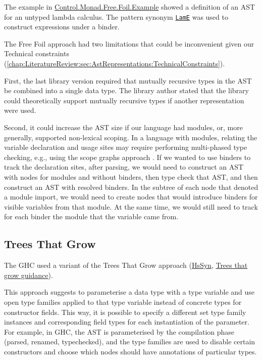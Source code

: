 The example in \href{https://hackage.haskell.org/package/free-foil-0.2.0/docs/Control-Monad-Free-Foil-Example.html}{Control.Monad.Free.Foil.Example} showed a definition of an AST for an untyped lambda calculus. The pattern synonym \href{https://hackage.haskell.org/package/free-foil-0.2.0/docs/src/Control.Monad.Free.Foil.Example.html#LamE}{\texttt{LamE}} was used to construct expressions under a binder.

The Free Foil approach had two limitations that could be inconvenient given our Technical constraints (\cref{chap:LiteratureReview:sec:AstRepresentations:TechnicalConstraints}).

First, the last library version required that mutually recursive types in the AST be combined into a single data type. The library author stated that the library could theoretically support mutually recursive types if another representation were used.

Second, it could increase the AST size if our language had modules, or, more generally, supported non-lexical scoping.
In a language with modules, relating the variable declaration and usage sites may require performing multi-phased type checking, e.g., using the scope graphs approach \cite{poulsen-monadic-2023}.
If we wanted to use binders to track the declaration sites, after parsing, we would need to construct an AST with nodes for modules and without binders, then type check that AST, and then construct an AST with resolved binders.
In the subtree of each node that denoted a module import, we would need to create nodes that would introduce binders for visible variables from that module.
At the same time, we would still need to track for each binder the module that the variable came from.

\subsection{Trees That Grow}
\label{chap:LiteratureReview:sec:AstRepresentations:TreesThatGrow}

The GHC used a variant of the Trees That Grow \cite{najd-trees-2016} approach (\href{https://gitlab.haskell.org/ghc/ghc/-/wikis/implementing-trees-that-grow/hs-syn}{HsSyn}, \href{https://gitlab.haskell.org/ghc/ghc/-/wikis/implementing-trees-that-grow/trees-that-grow-guidance}{Trees that grow guidance}).

This approach suggests to parameterise a data type with a type variable and use open type families applied to that type variable instead of concrete types for constructor fields. This way, it is possible to specify a different set type family instances and corresponding field types for each instantiation of the parameter. For example, in GHC, the AST is parameterised by the compilation phase (parsed, renamed, typechecked), and the type families are used to disable certain constructors and choose which nodes should have annotations of particular types.

